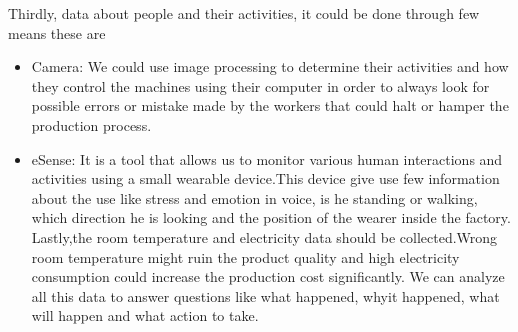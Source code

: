 \documentclass{article}
\begin{document}
\begin{normalsize}
      Thirdly, data about people and their activities, it could be done through few means these are 
       	\begin{itemize}
        
\item{Camera: We could use image processing to determine their activities and how they control the machines using their computer in order to always look for possible errors or mistake made by the workers that could halt or hamper the production process. }
\item{eSense: It is a tool that allows us to monitor various human interactions and activities using a small wearable device.This device give use few information about the use like stress and emotion in voice, is he standing or walking, which direction he is looking and the position of the wearer inside the factory.
} 
	Lastly,the room temperature and electricity data should be collected.Wrong room temperature might ruin the product quality and 
high electricity consumption could increase the production cost significantly.
	We can analyze all this data to answer questions like what happened, whyit happened, what will happen and what action to take.


	\end{itemize}
\end{normalsize}
  
\end{document}
